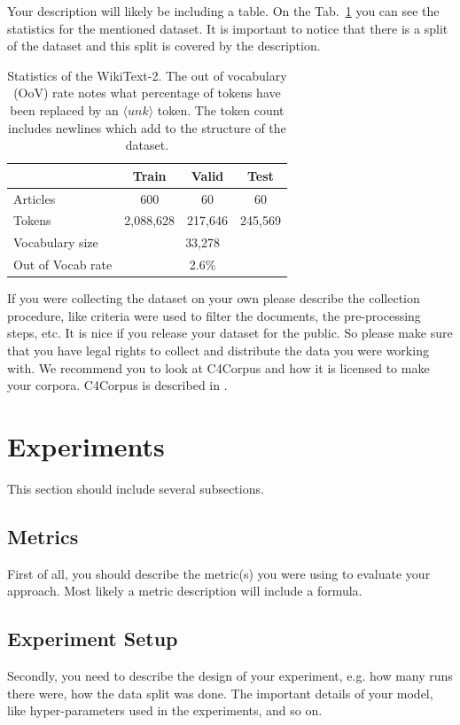 \documentclass{article}
\begin{document}
Your description will likely be including a table. On the Tab.~\ref{tab:statistics} you can see the statistics for the mentioned dataset. It is important to notice that there is a split of the dataset and this split is covered by the description.

\begin{table}[tbh!]
\begin{center}
\begin{tabular}[t]{|l|ccc|}
\hline
 & Train & Valid & Test \\
\hline
Articles & 600 & 60 & 60  \\
Tokens& 2,088,628 & 217,646 & 245,569 \\
Vocabulary size & \multicolumn{3}{c|}{33,278} \\
Out of Vocab rate &  \multicolumn{3}{c|}{2.6\%}  \\
\hline
\end{tabular}
\caption{Statistics of the WikiText-2. The out of vocabulary (OoV) rate notes what percentage of tokens have been replaced by an $\langle unk \rangle$ token. The token count includes newlines which add to the structure of the dataset.}
\label{tab:statistics}
\end{center}
\end{table}

If you were collecting the dataset on your own please describe the collection procedure, like criteria were used to filter the documents, the pre-processing steps, etc. It is nice if you release your dataset for the public. So please make sure that you have legal rights to collect and distribute the data you were working with. We recommend you to look at C4Corpus and how it is licensed to make your corpora. C4Corpus is described in \cite{habernal2016c4corpus}.

\section{Experiments}
This section should include several subsections.
\subsection{Metrics}
First of all, you should describe the metric(s) you were using to evaluate your approach. Most likely a metric description will include a formula.

\subsection{Experiment Setup}
Secondly, you need to describe the design of your experiment, e.g. how many runs there were, how the data split was done. The important details of your model, like hyper-parameters used in the experiments, and so on.
\end{document}
